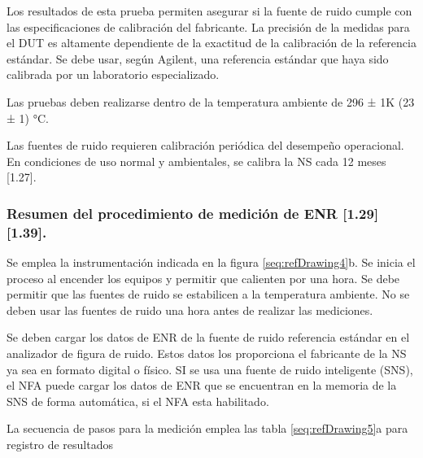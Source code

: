 Los resultados de esta prueba permiten asegurar si la fuente de ruido cumple con las especificaciones de calibración del fabricante. La precisión de la medidas para el DUT es altamente dependiente de la exactitud de la calibración de la referencia estándar. Se debe usar, según Agilent, una referencia estándar que haya sido calibrada por un laboratorio especializado.

Las pruebas deben realizarse dentro de la temperatura ambiente de 296 ± 1K (23 ± 1) °C.

Las fuentes de ruido requieren calibración periódica del desempeño operacional. En condiciones de uso normal y ambientales, se calibra la NS cada 12 meses [1.27].

\subsubsection{Resumen del procedimiento de medición de ENR [1.29] [1.39].}
Se emplea la instrumentación indicada en la figura \ref{seq:refDrawing4}b. Se inicia el proceso al encender los equipos y permitir que calienten por una hora. Se debe permitir que las fuentes de ruido se estabilicen a la temperatura	ambiente. No se deben usar las fuentes de ruido una hora antes de realizar las mediciones.
	
Se deben cargar los datos de ENR de la fuente de ruido referencia estándar en el analizador de figura de ruido. Estos datos los proporciona el fabricante de la NS ya sea en formato digital o físico. SI se usa una fuente de ruido inteligente (SNS), el NFA puede cargar los datos de ENR que se encuentran en la memoria de la SNS de forma automática, si el NFA esta habilitado.

La secuencia de pasos para la medición emplea las tabla \ref{seq:refDrawing5}a para registro de resultados

